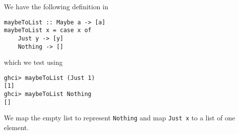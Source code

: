 
We have the following definition in 
\scriptsize\begin{verbatim}
maybeToList :: Maybe a -> [a]
maybeToList x = case x of
    Just y -> [y]
    Nothing -> []
\end{verbatim}\normalsize
which we test using
\scriptsize\begin{verbatim}
ghci> maybeToList (Just 1)
[1]
ghci> maybeToList Nothing
[]
\end{verbatim}\normalsize
We map the empty list to represent \verb|Nothing| and map \verb|Just x| to a list 
of one element.
